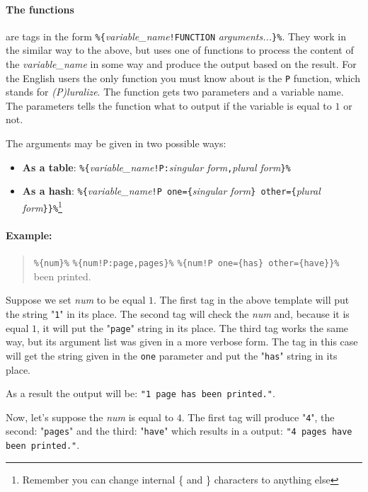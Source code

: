 \paragraph{The functions} are tags in the form \verb+%{+\textit{variable\_name}\verb+!FUNCTION+ \textit{arguments...}\verb+}%+.
They work in the similar way to the above, but uses one of \mulan{} functions to process the content of the \textit{variable\_name} in some way and produce the output based on the result.
For the English users the only function you must know about is the \texttt{P} function, which stands for \textit{(P)luralize}.
The function gets two parameters and a variable name. The parameters tells the function what to output if the variable is equal to $1$ or not.

The arguments may be given in two possible ways:
\begin{itemize}
	\item \textbf{As a table}: \verb+%{+\textit{variable\_name}\verb+!P:+\textit{singular form}\verb+,+\textit{plural form}\verb+}%+
	\item \textbf{As a hash}: \verb+%{+\textit{variable\_name}\verb+!P one={+\textit{singular form}\verb+} other={+\textit{plural form}\verb+}}%+\footnote{Remember you can change internal \{
	and \} characters to anything else}
\end{itemize}

\paragraph{Example:}
\begin{quote}
	\verb+%{num}%+ \verb+%{num!P:page,pages}%+ \verb+%{num!P one={has} other={have}}%+ been printed.
\end{quote}
Suppose we set \textit{num} to be equal $1$. The first tag in the above template will put the string "\texttt{1}" in its place.
The second tag will check the \textit{num} and, because it is equal $1$, it will put the "\texttt{page}" string in its place.
The third tag works the same way, but its argument list was given in a more verbose form. The tag in this case will get the string given in the \texttt{one} parameter
and put the "\texttt{has}" string in its place.

As a result the output will be: \texttt{"1 page has been printed."}.

Now, let's suppose the \textit{num} is equal to $4$. 
The first tag will produce "\texttt{4}", the second: "\texttt{pages}" and the third: "\texttt{have}" which results in a output:
\texttt{"4 pages have been printed."}.

